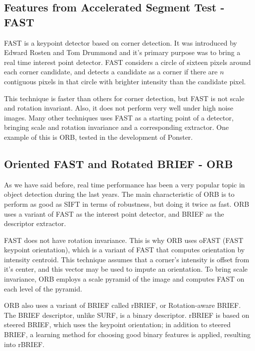 \subsection{Features from Accelerated Segment Test - FAST}
FAST is a keypoint detector based on corner detection. It was introduced by
Edward Rosten and Tom Drummond\cite{Rosten:2006:MLH:2094437.2094478} and it's
primary purpose was to bring a real 
time interest point detector. FAST considers a circle of sixteen pixels around
each corner candidate, and detects a candidate as a corner if there are $n$
contiguous pixels in that circle with brighter intensity than the candidate
pixel. %

This technique is faster than others for corner detection, but FAST is not
scale and rotation invariant. Also, it does not perform very well under high
noise images. Many other techniques uses FAST as a starting point of a
detector, bringing scale and rotation invariance and a corresponding
extractor. One example of this is ORB, tested in the development of Ponster.

\subsection{Oriented FAST and Rotated BRIEF - ORB}
As we have said before, real time performance has been a very popular topic in
object detection during the last years. The main characteristic of ORB is to
perform as good as SIFT in terms of robustness, but doing it twice as fast. ORB
uses a variant of FAST as the interest point detector, and BRIEF as the
descriptor extractor.  

FAST does not have rotation invariance. This is why ORB uses oFAST (FAST
keypoint orientation), which is a variant of FAST that computes orientation by
intensity centroid. This technique assumes that a corner's intensity is offset
from it's center, and this vector may be used to impute an
orientation\cite{6126544}. To bring scale invariance, ORB employs a scale pyramid of the image
and computes FAST on each level of the pyramid.

ORB also uses a variant of BRIEF called rBRIEF, or Rotation-aware BRIEF. The
BRIEF descriptor, unlike SURF, is a binary descriptor. rBRIEF is based on
steered BRIEF, which uses the keypoint orientation; in addition to steered
BRIEF, a learning method for choosing good binary features is applied,
resulting into rBRIEF.

